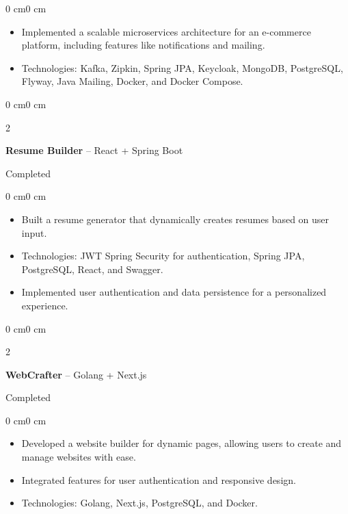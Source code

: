 \documentclass[10pt, letterpaper]{article}
\newenvironment{highlights}{
    \begin{itemize}[
        topsep=0.10 cm,
        parsep=0.10 cm,
        partopsep=0pt,
        itemsep=0pt,
        leftmargin=0 cm + 10pt
    ]
}{
    \end{itemize}
}
\newenvironment{onecolentry}{
    \begin{adjustwidth}{0 cm}{0 cm}
}{
    \end{adjustwidth}
}
\newenvironment{twocolentry}[2][]{
    \onecolentry
    \def\secondColumn{#2}
    \setcolumnwidth{\fill, 4.5 cm}
    \begin{paracol}{2}
}{
    \switchcolumn \raggedleft \secondColumn
    \end{paracol}
    \endonecolentry
}
\begin{document}
\vspace{0.10 cm}
\begin{onecolentry}
    \begin{highlights}
        \item Implemented a scalable microservices architecture for an e-commerce platform, including features like notifications and mailing.
        \item Technologies: Kafka, Zipkin, Spring JPA, Keycloak, MongoDB, PostgreSQL, Flyway, Java Mailing, Docker, and Docker Compose.
    \end{highlights}
\end{onecolentry}

\vspace{0.2 cm}

\begin{twocolentry}{Completed}
    \textbf{Resume Builder} -- React + Spring Boot
\end{twocolentry}

\vspace{0.10 cm}
\begin{onecolentry}
    \begin{highlights}
        \item Built a resume generator that dynamically creates resumes based on user input.
        \item Technologies: JWT Spring Security for authentication, Spring JPA, PostgreSQL, React, and Swagger.
        \item Implemented user authentication and data persistence for a personalized experience.
    \end{highlights}
\end{onecolentry}

\vspace{0.2 cm}

\begin{twocolentry}{Completed}
    \textbf{WebCrafter} -- Golang + Next.js
\end{twocolentry}

\vspace{0.10 cm}
\begin{onecolentry}
    \begin{highlights}
        \item Developed a website builder for dynamic pages, allowing users to create and manage websites with ease.
        \item Integrated features for user authentication and responsive design.
        \item Technologies: Golang, Next.js, PostgreSQL, and Docker.
    \end{highlights}
\end{onecolentry}
\vspace{0.2 cm}
\end{document}

